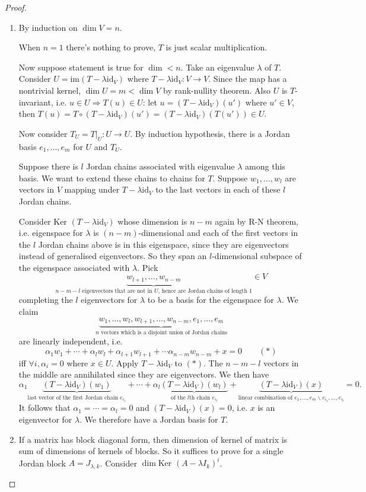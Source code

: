 \documentclass[a4paper]{article}
\newcommand{\Ker}{\text{Ker }}
\newcommand{\id}{\text{id}}
\newcommand{\im}{\text{im}}
\theoremstyle{definition}
\begin{document}
\begin{proof}
\begin{enumerate}
    \item By induction on $\dim V=n$.
    
    When $n=1$ there's nothing to prove, $T$ is just scalar multiplication.
    
    Now suppose statement is true for $\dim < n$. Take an eigenvalue $\lambda$ of $T$. Consider $U=\im (T-\lambda \id_V)$ where $T-\lambda \id_V:V\rightarrow V$. Since the map has a nontrivial kernel, $\dim U=m<\dim V$ by rank-nullity theorem. Also $U$ is $T$-invariant, i.e. $u\in U \Rightarrow T(u)\in U$: let $u=(T-\lambda \id_V)(u')$ where $u' \in V$, then $T(u)=T\circ (T-\lambda \id_V)(u')=(T-\lambda \id_V) (T(u')) \in U$.
    
    Now consider $T_U=\left. T \right|_U : U\rightarrow U$. By induction hypothesis, there is a Jordan basis $e_1,\ldots,e_m$ for $U$ and $T_U$.
    
    Suppose there is $l$ Jordan chains associated with eigenvalue $\lambda$ among this basis. We want to extend these chains to chains for $T$. Suppose $w_1,\ldots,w_l$ are vectors in $V$ mapping under $T-\lambda \id_V$ to the last vectors in each of these $l$ Jordan chains.
    
    Consider $\Ker (T-\lambda \id_V)$ whose dimension is $n-m$ again by R-N theorem, i.e. eigenspace for $\lambda$ is $(n-m)$-dimensional and each of the first vectors in the $l$ Jordan chains above is in this eigenspace, since they are eigenvectors instead of generalised eigenvectors. So they span an $l$-dimensional subspace of the eigenspace associated with $\lambda$. Pick
\[
\underbrace{w_{l+1},\ldots,w_{n-m}}_{n-m-l\text{ eigenvectors that are not in }U\text{, hence are Jordan chains of length 1}} \in V
\]
completing the $l$ eigenvectors for $\lambda$ to be a basis for the eigenspace for $\lambda$. We claim
\[
\underbrace{w_1,\ldots,w_l,w_{l+1},\ldots,w_{n-m},e_1,\ldots,e_m}_{n\text{ vectors which is a disjoint union of Jordan chains}}
\]
are linearly independent, i.e.
\[
\alpha_1 w_1+\cdots+\alpha_l w_l+\alpha_{l+1} w_{l+1}+\cdots \alpha_{n-m} w_{n-m}+x=0\qquad (\ast)
\]
iff $\forall i, \alpha_i=0$ where $x\in U$. Apply $T-\lambda \id _V$ to $(\ast)$. The $n-m-l$ vectors in the middle are annihilated since they are eigenvectors. We then have
\[
\alpha_1 \underbrace{(T-\lambda \id_V)(w_1)}_{\text{last vector of the first Jordan chain } e_{i_1}}+\cdots+\alpha_l \underbrace{(T-\lambda \id_V)(w_l)}_{\text{of the }l\text{th chain } e_{i_l}}+\underbrace{(T-\lambda \id_V)(x)}_{\text{linear combination of }e_1,\ldots,e_m \backslash e_{i_1},\ldots,e_{i_l}}=0 .
\]
It follows that $\alpha_1=\cdots=\alpha_l=0$ and $(T-\lambda \id_V)(x)=0$, i.e. $x$ is an eigenvector for $\lambda$. We therefore have a Jordan basis for $T$.
    \item If a matrix has block diagonal form, then dimension of kernel of matrix is sum of dimensions of kernels of blocks. So it suffices to prove for a single Jordan block $A = J_{\lambda,k}$. Consider $\dim \Ker (A-\lambda I_k)^i$.
    

\end{enumerate}
\end{proof}
\end{document}
